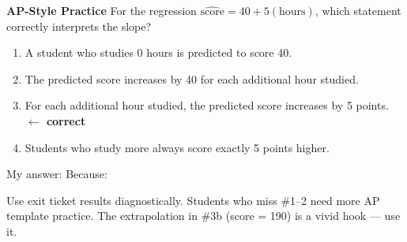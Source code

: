 \documentclass[10pt]{article}
\begin{document}
\vspace{0.14in}

\begin{tcolorbox}[colback=redbg, colframe=redacc, boxrule=0.8pt, arc=2mm,
    left=4mm, right=4mm, top=2.5mm, bottom=2.5mm]
\small\textbf{AP-Style Practice}\enspace
For the regression $\widehat{\text{score}} = 40 + 5(\text{hours})$, which statement correctly
interprets the slope?

\vspace{7pt}
\begin{enumerate}[label=\textbf{(\Alph*)}, leftmargin=2em, itemsep=4pt]
  \item A student who studies 0 hours is predicted to score 40.
  \item The predicted score increases by 40 for each additional hour studied.
  \item For each additional hour studied, the predicted score increases by 5 points.
        \textcolor{keyred}{\textbf{$\leftarrow$ correct}}
  \item Students who study more always score exactly 5 points higher.
\end{enumerate}
\end{tcolorbox}

\vspace{0.08in}
\noindent\textcolor{slate}{\small My answer:  \quad Because: }

\begin{teachernote}
Use exit ticket results diagnostically. Students who miss \#1--2 need more AP template
practice. The extrapolation in \#3b (score = 190) is a vivid hook --- use it.
\end{teachernote}
\end{document}
